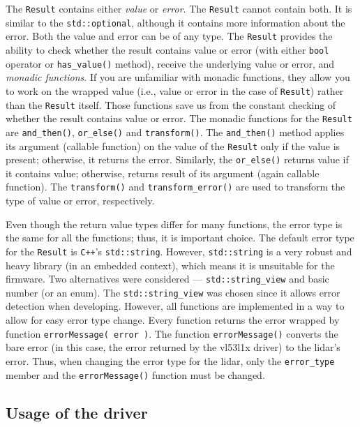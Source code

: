\documentclass[
  digital,     %
  oneside,     %
  nosansbold,  %
  nocolorbold, %
  nolof,         %
  nolot,         %
]{fithesis4}
\begin{document}
The \lstinline|Result| contains either \emph{value} or \emph{error}. The \lstinline|Result| cannot
contain both. It is similar to the \lstinline|std::optional|, although it contains more information
about the error. Both the value and error can be of any type. The \lstinline|Result| provides the
ability to check whether the result contains value or error (with either \lstinline|bool| operator
or \lstinline|has_value()| method), receive the underlying value or error, and \emph{monadic
functions}. If you are unfamiliar with monadic functions, they allow you to work on the wrapped
value (i.e., value or error in the case of \lstinline|Result|) rather than the \lstinline|Result|
itself. Those functions save us from the constant checking of whether the result contains value or
error. The monadic functions for the \lstinline|Result| are \lstinline|and_then()|,
\lstinline|or_else()| and \lstinline|transform()|. The \lstinline|and_then()| method applies its
argument (callable function) on the value of the \lstinline|Result| only if the value is present;
otherwise, it returns the error. Similarly, the \lstinline|or_else()| returns value if it contains
value; otherwise, returns result of its argument (again callable function). The
\lstinline|transform()| and \lstinline|transform_error()| are used to transform the type of value or
error, respectively.

Even though the return value types differ for many functions, the error type is the same for all the
functions; thus, it is important choice. The default error type for the \lstinline|Result| is
\verb|C++|'s \lstinline|std::string|. However, \lstinline|std::string| is a very robust and heavy
library (in an embedded context), which means it is unsuitable for the firmware. Two alternatives
were considered --- \lstinline|std::string_view| and basic number (or an enum). The
\lstinline|std::string_view| was chosen since it allows error detection when developing. However,
all functions are implemented in a way to allow for easy error type change. Every function returns
the error wrapped by function \lstinline|errorMessage( error )|. The function
\lstinline|errorMessage()| converts the bare error (in this case, the error returned by the
\gls{vl53l1x} driver) to the \acrshort{lidar}'s error. Thus, when changing the error type for the
\acrshort{lidar}, only the \lstinline|error_type| member and the \lstinline|errorMessage()| function
must be changed.

\subsection{ Usage of the driver }
\end{document}
